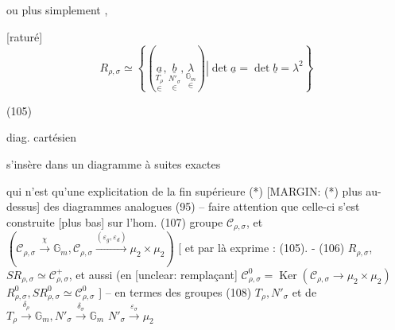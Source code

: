 \begin{enumerate}
ou plus simplement ,

[raturé]
$$ R_{\rho,\sigma} \simeq \left\{ (\underset{\in}{\underset{T_\rho}{\underline{a}}}, \underset{\in}{\underset{N'_\sigma}{\underline{b}}}, \underset{\in}{\underset{\mathbb{G}_m}{\lambda}}) \left| \det \underline{a} = \det \underline{b} = \lambda^2 \right. \right\} $$

(105)
diag. cartésien

\newpage


s'insère dans un diagramme à suites exactes


qui n'est qu'une explicitation de la
fin supérieure (*) [MARGIN: (*) plus au-dessus] des diagrammes analogues
(95) -- faire attention que celle-ci s'est
construite [plus bas] sur l'hom.
(107) groupe $\mathcal{C}_{\rho,\sigma}$, et $(\mathcal{C}_{\rho,\sigma} \xrightarrow{\chi} \mathbb{G}_m, \mathcal{C}_{\rho,\sigma} \xrightarrow{(\varepsilon_g, \varepsilon_d)} \mu_2 \times \mu_2)$
[ et par là exprime : (105). - (106) $R_{\rho,\sigma}$,
$S R_{\rho,\sigma} \simeq \mathcal{C}^+_{\rho,\sigma}$, et aussi (en [unclear: remplaçant]
$\mathcal{C}^0_{\rho,\sigma} = \operatorname{Ker}(\mathcal{C}_{\rho,\sigma} \to \mu_2 \times \mu_2)$
$R^0_{\rho,\sigma}, S R^0_{\rho,\sigma} \simeq \mathcal{C}^0_{\rho,\sigma}$ ] -- en termes des
groupes
(108) $T_{\rho}, N'_{\sigma}$ et de $T_{\rho} \xrightarrow{\delta_{\rho}} \mathbb{G}_m, N'_{\sigma} \xrightarrow{\delta_{\sigma}} \mathbb{G}_m$
$N'_{\sigma} \xrightarrow{\varepsilon_{\sigma}} \mu_2$


\end{enumerate}
